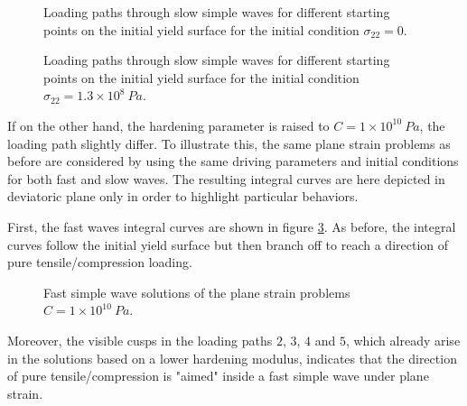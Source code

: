 \begin{figure}[h!]
  \centering
  {}
  {}
  \caption{Loading paths through slow simple waves for different starting points on the initial yield surface for the initial condition $\sigma_{22}=0$.}
  \label{fig:slow_path_plane_strains2}
\end{figure}
\begin{figure}[h!]
  \centering
  {}
  {}
  \caption{Loading paths through slow simple waves for different starting points on the initial yield surface for the initial condition $\sigma_{22}=1.3 \times 10^{8} \: Pa$.}
  \label{fig:slow_path_plane_strains3}
\end{figure}

If on the other hand, the hardening parameter is raised to $C=1\times10^{10} \: Pa$, the loading path slightly differ.
To illustrate this, the same plane strain problems as before are considered by using the same driving parameters and initial conditions for both fast and slow waves.
The resulting integral curves are here depicted in deviatoric plane only in order to highlight particular behaviors.

First, the fast waves integral curves are shown in figure \ref{fig:fast_H}.
As before, the integral curves follow the initial yield surface but then branch off to reach a direction of pure tensile/compression loading.
\begin{figure}[h!]
  \centering
  
  \caption{Fast simple wave solutions of the plane strain problems $C=1\times10^{10} \: Pa$.}
  \label{fig:fast_H}
\end{figure}
Moreover, the visible cusps in the loading paths $2$, $3$, $4$ and $5$, which already arise in the solutions based on a lower hardening modulus, indicates that the direction of pure tensile/compression is "aimed" inside a fast simple wave under plane strain. 

